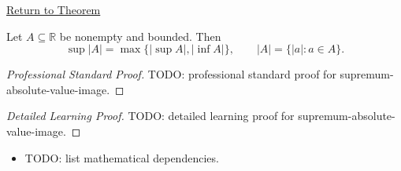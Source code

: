 \newpage
{}
\label{prf:supremum-absolute-value-image}

\begin{remark*}[Return]
\hyperref[thm:supremum-absolute-value-image]{Return to Theorem}
\end{remark*}

\begin{theorem*}
Let $A\subseteq\mathbb{R}$ be nonempty and bounded. Then
\[
  \sup |A|=\max\{|\sup A|,|\inf A|\},
  \qquad
  |A|=\{|a|:a\in A\}.
\]
\end{theorem*}

\begin{proof}[Professional Standard Proof]
\LRAProofBodyStart
TODO: professional standard proof for supremum-absolute-value-image.
\end{proof}

\begin{proof}[Detailed Learning Proof]
\LRAProofBodyStart
TODO: detailed learning proof for supremum-absolute-value-image.
\end{proof}

\begin{remark*}
\end{remark*}

\begin{dependencies}
\begin{itemize}
  \item TODO: list mathematical dependencies.
\end{itemize}
\end{dependencies}

\clearpage
